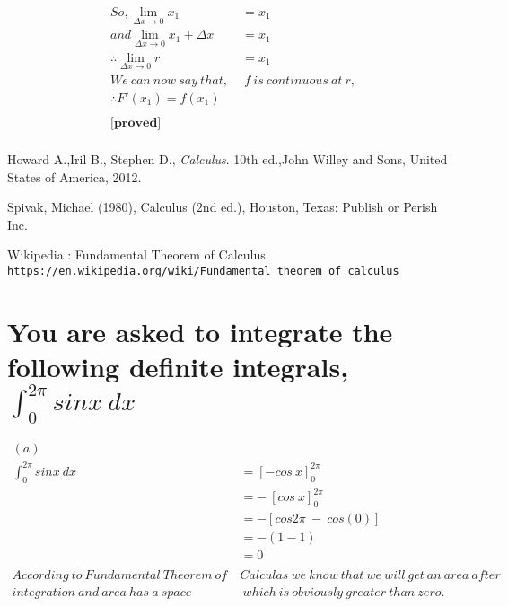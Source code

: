 \documentclass[12pt]{article}%
\begin{document}
\newpage

\begin{align*}
    So, \lim_{\Delta x \to 0}x_1 \ &= x_1 \\
    and \lim_{\Delta x \to 0}x_1 + \Delta x \ &= x_1\\
   \therefore \lim_{\Delta x \to 0}r \ &= x_1\\
   We \ can \ now \ say \ that, \ & \ f \ is \ continuous \ at \ r,\\
   \therefore {F}'(x_1) = f(x_1)\\\\
   \textbf{[proved]}\\
\end{align*}


\begin{thebibliography}{9}
Howard A.,Iril B., Stephen D., 
\textit{Calculus}. 
10th ed.,John Willey and Sons, United States of America, 2012.

Spivak, Michael (1980), Calculus (2nd ed.), Houston, Texas: Publish or Perish Inc.

Wikipedia : Fundamental Theorem of Calculus.
\\\texttt{https://en.wikipedia.org/wiki/Fundamental\_theorem\_of\_calculus}
\end{thebibliography}


\section{You are asked to integrate the following definite integrals,\\ $\int_{0}^{2\pi} sinx\:dx$}

\begin{align*}
    (a)\\
    \int_{0}^{2\pi} sinx\:dx &= \left[-cos\:x \right]_{0}^{2\pi}\\
                             &= -\:\left[cos\:x \right]_{0}^{2\pi}\\
                             &= -[cos2\pi \: - \: cos(0)]\\
                             &= -(1-1)\\
                             &= 0\\\\
    According \ to \ Fundamental \ Theorem \ of \ &Calculas \ we \ know \ that \ we \ will \ get \ an \ area \ after \\ integration \ and \ area \ has \ a \ space& \ which \ is \ obviously \ greater \ than \ zero.\\
\end{align*}
\end{document}
